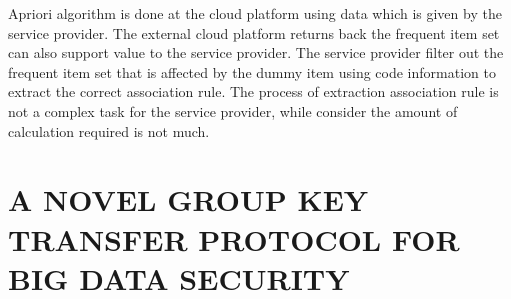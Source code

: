 \documentclass[10pt,a4paper,journal]{IEEEtran}
\begin{document}
\hspace{2em} Apriori algorithm is done at the cloud platform using data which is given by the service provider. The external cloud platform returns back the frequent item set can also support value to the service provider. The service provider filter out the frequent item set that is affected by the dummy item using code information to extract the correct association rule. The process of extraction association rule is not a complex task for the service provider, while consider the amount of calculation required is not much.







\section{A NOVEL GROUP KEY TRANSFER  PROTOCOL FOR BIG DATA SECURITY}
\end{document}
